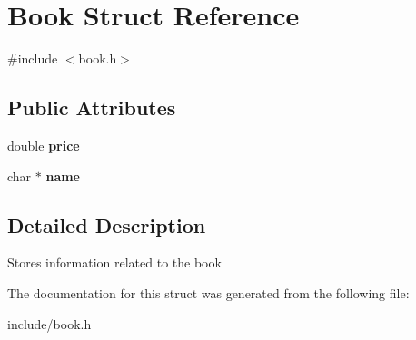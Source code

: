 \hypertarget{structBook}{}\section{Book Struct Reference}
\label{structBook}


{\ttfamily \#include $<$book.\+h$>$}

\subsection*{Public Attributes}
\begin{DoxyCompactItemize}
\item 
\mbox{\label{structBook_afa8e149d0bfb4372166d0ccfe8aa30b7}} 
double {\bfseries price}
\item 
\mbox{\label{structBook_ada209b91ad1ac2814e8d24036cf42fef}} 
char $\ast$ {\bfseries name}
\end{DoxyCompactItemize}


\subsection{Detailed Description}
Stores information related to the book 

The documentation for this struct was generated from the following file\+:\begin{DoxyCompactItemize}
\item 
include/book.\+h\end{DoxyCompactItemize}
